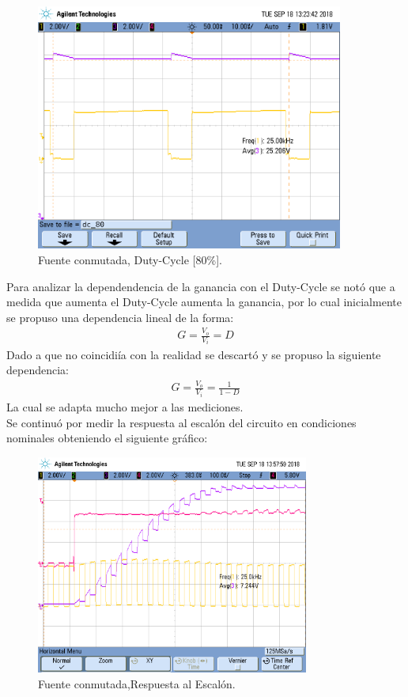 \begin{figure}[H]
	\centering
	\includegraphics[width=0.9\textwidth]{Imagenes/dc_80.png}
\caption{Fuente conmutada, Duty-Cycle [80\%].}
	\label{fig:fcon80}
\end{figure}
Para analizar la dependendencia de la ganancia con el Duty-Cycle se notó que a medida que aumenta el Duty-Cycle aumenta la ganancia, por lo cual inicialmente se propuso una dependencia lineal de la forma:
\begin{align}G = \frac{V_o}{V_i} = D \end{align}
Dado a que no coincidiía con la realidad se descartó y se propuso la siguiente dependencia:
\begin{align}G = \frac{V_o}{V_i} = \frac{1}{1-D} \end{align}
La cual se adapta mucho mejor a las mediciones.\\
Se continuó por medir la respuesta al escalón del circuito en condiciones nominales obteniendo el siguiente gráfico:
\begin{figure}[H]
	\centering
	\includegraphics[width=0.8\textwidth]{Imagenes/sr.png}
\caption{Fuente conmutada,Respuesta al Escalón.}
	\label{fig:fconsr}
\end{figure}
